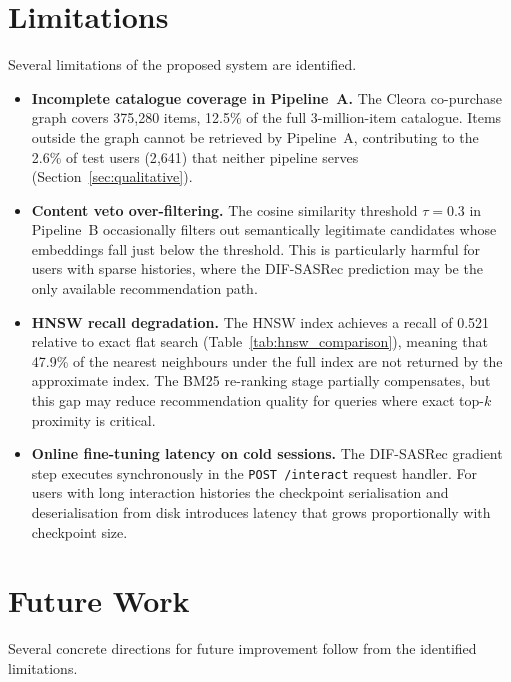 \section{Limitations}
\label{sec:conclusion_limitations}

Several limitations of the proposed system are identified.

\begin{itemize}
    \item \textbf{Incomplete catalogue coverage in Pipeline~A.}
    The Cleora co-purchase graph covers 375{,}280 items, 12.5\% of the full 3-million-item catalogue.
    Items outside the graph cannot be retrieved by Pipeline~A, contributing to the 2.6\% of test users (2{,}641) that neither pipeline serves (Section~\ref{sec:qualitative}).

    \item \textbf{Content veto over-filtering.}
    The cosine similarity threshold $\tau = 0.3$ in Pipeline~B occasionally filters out semantically legitimate candidates whose embeddings fall just below the threshold.
    This is particularly harmful for users with sparse histories, where the DIF-SASRec prediction may be the only available recommendation path.

    \item \textbf{HNSW recall degradation.}
    The HNSW index achieves a recall of 0.521 relative to exact flat search (Table~\ref{tab:hnsw_comparison}), meaning that 47.9\% of the nearest neighbours under the full index are not returned by the approximate index.
    The BM25 re-ranking stage partially compensates, but this gap may reduce recommendation quality for queries where exact top-$k$ proximity is critical.

    \item \textbf{Online fine-tuning latency on cold sessions.}
    The DIF-SASRec gradient step executes synchronously in the \texttt{POST /interact} request handler.
    For users with long interaction histories the checkpoint serialisation and deserialisation from disk introduces latency that grows proportionally with checkpoint size.

\end{itemize}


\section{Future Work}
\label{sec:conclusion_future}

Several concrete directions for future improvement follow from the identified limitations.

